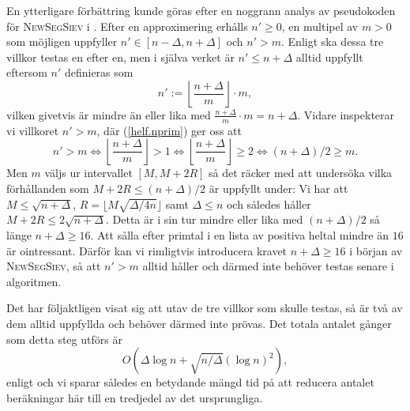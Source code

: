 En ytterligare förbättring kunde göras efter en noggrann analys av pseudokoden för \textsc{NewSegSiev} i \cite[s.338]{HaraldSieve}.
Efter en approximering erhålls $n'\geq0$, en multipel av $m>0$ som möjligen uppfyller $n'\in[n-\Delta,n+\Delta]$ och $n'>m$.
Enligt \cite{HaraldSieve} ska dessa tre villkor testas en efter en,
men i själva verket är $n'\leq n+\Delta$ alltid uppfyllt eftersom $n'$ definieras som
\begin{equation} \label{helf.nprim}
    n' := \left\lfloor \frac{n+\Delta}{m} \right\rfloor\cdot m,
\end{equation}
vilken givetvis är mindre än eller lika med $\frac{n+\Delta}{m}\cdot m = n+\Delta$. 
Vidare inspekterar vi villkoret $n'>m$, där (\ref{helf.nprim}) ger oss att 
\begin{equation*}
    n'>m \iff
    \left\lfloor \frac{n+\Delta}{m} \right\rfloor > 1 \iff
    \left\lfloor \frac{n+\Delta}{m} \right\rfloor \geq 2 \iff
    (n+\Delta)/2\geq m.
\end{equation*}
Men $m$ väljs ur intervallet $[M,M+2R]$ så det räcker med att undersöka vilka förhållanden som  $M+2R\leq(n+\Delta)/2$ är uppfyllt under:
Vi har att $M\leq\sqrt{n+\Delta}$, $R=\lfloor M\sqrt{\Delta/4n}\rfloor$ samt $\Delta\leq n$ och  
således håller $M+2R \leq 2\sqrt{n+\Delta}$.
Detta är i sin tur mindre eller lika med $(n+\Delta)/2$ så länge $n+\Delta\geq16$.
Att sålla efter primtal i en lista av positiva heltal mindre än $16$ är ointressant.
Därför kan vi rimligtvis introducera kravet $n+\Delta\geq16$ i början av \textsc{NewSegSiev},
så att $n'>m$ alltid håller och därmed inte behöver testas senare i algoritmen.

Det har följaktligen visat sig att utav de tre villkor som skulle testas, 
så är två av dem alltid uppfyllda och behöver därmed inte prövas.
Det totala antalet gånger som detta steg utförs är
\begin{equation*}
    O\left(\Delta\log n + \sqrt{n/\Delta}(\log n)^2\right),
\end{equation*}
enligt \cite[s.346]{HaraldSieve} och vi sparar således en betydande mängd tid på att reducera antalet beräkningar här till en tredjedel av det ursprungliga.



